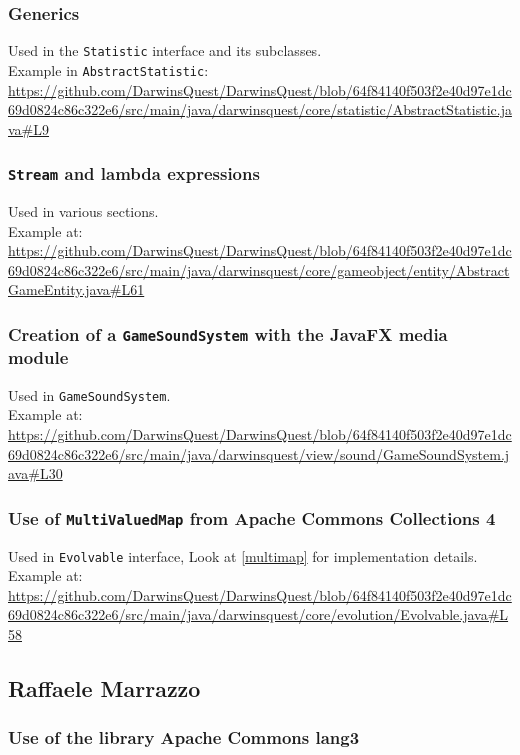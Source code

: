 \documentclass[12pt, a4paper]{report}
\theoremstyle{definition}
\begin{document}
    \subsubsection{Generics}
    Used in the \verb|Statistic| interface and its subclasses.\\
    Example in \verb|AbstractStatistic|: \url{https://github.com/DarwinsQuest/DarwinsQuest/blob/64f84140f503f2e40d97e1dc69d0824c86c322e6/src/main/java/darwinsquest/core/statistic/AbstractStatistic.java#L9}

    \subsubsection{\texttt{Stream} and lambda expressions}
    Used in various sections.\\
    Example at: \url{https://github.com/DarwinsQuest/DarwinsQuest/blob/64f84140f503f2e40d97e1dc69d0824c86c322e6/src/main/java/darwinsquest/core/gameobject/entity/AbstractGameEntity.java#L61}

    \subsubsection{Creation of a \texttt{GameSoundSystem} with the JavaFX media module}
    Used in \verb|GameSoundSystem|.\\
    Example at: \url{https://github.com/DarwinsQuest/DarwinsQuest/blob/64f84140f503f2e40d97e1dc69d0824c86c322e6/src/main/java/darwinsquest/view/sound/GameSoundSystem.java#L30}

    \subsubsection{Use of \texttt{MultiValuedMap} from Apache Commons Collections 4}
    Used in \verb|Evolvable| interface, Look at \ref{multimap} for implementation details.\\
    Example at: \url{https://github.com/DarwinsQuest/DarwinsQuest/blob/64f84140f503f2e40d97e1dc69d0824c86c322e6/src/main/java/darwinsquest/core/evolution/Evolvable.java#L58}

    \subsection*{Raffaele Marrazzo}

    \subsubsection{Use of the library Apache Commons lang3}
    
\end{document}
